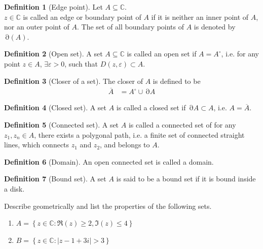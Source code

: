 \documentclass[titlepage, fleqn, a4paper, 12pt, twoside]{article}
\theoremstyle{definition}
\newtheorem{definition}{Definition}
\theoremstyle{theorem}
\DeclareMathOperator{\boundary}{\partial}
\begin{document}
\begin{definition}[Edge point]
	Let $A \subseteq \mathbb{C}$.\\
	$z \in \mathbb{C}$ is called an edge or boundary point of $A$ if it is neither an inner point of $A$, nor an outer point of $A$.
	The set of all boundary points of $A$ is denoted by $\boundary(A)$.
\end{definition}

\begin{definition}[Open set]
	A set $A \subseteq \mathbb{C}$ is called an open set if $A = A^{\circ}$, i.e. for any point $z \in A$, $\exists \varepsilon > 0$, such that $D(z,\varepsilon) \subset A$.
\end{definition}

\begin{definition}[Closer of a set]
	The closer of $A$ is defined to be
	\begin{align*}
		\overline{A} &= A^{\circ} \cup \boundary A
	\end{align*}
\end{definition}

\begin{definition}[Closed set]
	A set $A$ is called a closed set if $\boundary A \subset A$, i.e. $A = \overline{A}$.
\end{definition}

\begin{definition}[Connected set]
	A set $A$ is called a connected set of for any $z_1,z_n \in A$, there exists a polygonal path, i.e. a finite set of connected straight lines, which connects $z_1$ and $z_2$, and belongs to $A$.
\end{definition}

\begin{definition}[Domain]
	An open connected set is called a domain.
\end{definition}

\begin{definition}[Bound set]
	A set $A$ is said to be a bound set if it is bound inside a disk.
\end{definition}

\begin{question}
	Describe geometrically and list the properties of the following sets.
	\begin{enumerate}
		\item $A = \left\{ z \in \mathbb{C} : \Re(z) \ge 2 , \Im(z) \le 4 \right\}$
		\item $B = \left\{ z \in \mathbb{C} : |z - 1 + 3 i| > 3 \right\}$
	\end{enumerate}
\end{question}
\end{document}
